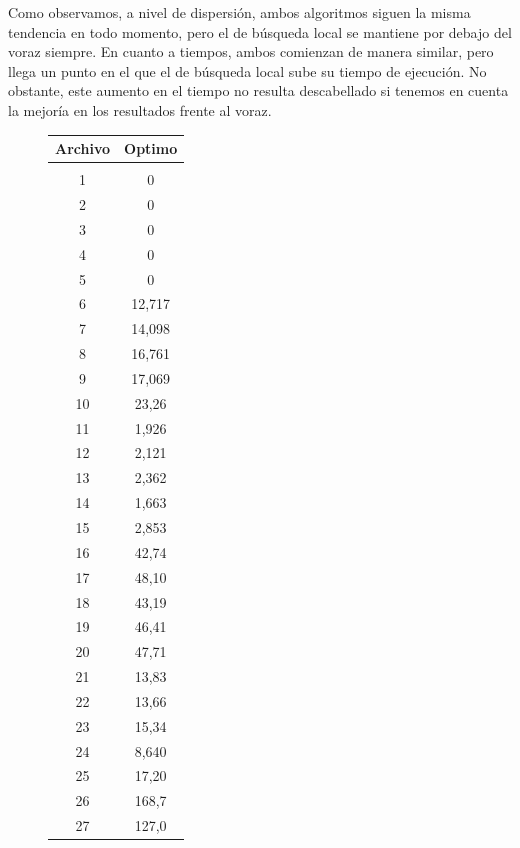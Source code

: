Como observamos, a nivel de dispersión, ambos algoritmos siguen la misma tendencia en todo momento, pero el de búsqueda local se mantiene por debajo del voraz siempre.
En cuanto a tiempos, ambos comienzan de manera similar, pero llega un punto en el que el de búsqueda local sube su tiempo de ejecución. No obstante, este aumento en el tiempo no resulta descabellado si tenemos en cuenta la mejoría en los resultados frente al voraz.

\newpage

\begin{figure}[h]
    \centering
    \begin{minipage}[l]{0.32\textwidth}
	    \begin{tabular}{|c|c|}
	        \hline
	        \textbf{Archivo} & \textbf{Optimo} \\
	        \hline
	        &\\
	        1 & 0\\
            2 & 0\\
            3 & 0\\
            4 & 0\\
            5 & 0\\
            6 & 12,717\\
            7 & 14,098\\
            8 & 16,761\\
            9 & 17,069\\
            10 & 23,26\\
            11 & 1,926\\
            12 & 2,121\\
            13 & 2,362\\
            14 & 1,663\\
            15 & 2,853\\
            16 & 42,74\\
            17 & 48,10\\
            18 & 43,19\\
            19 & 46,41\\
            20 & 47,71\\
            21 & 13,83\\
            22 & 13,66\\
            23 & 15,34\\
            24 & 8,640\\
            25 & 17,20\\
            26 & 168,7\\
            27 & 127,0\\

\end{tabular}
\end{minipage}
\end{figure}

